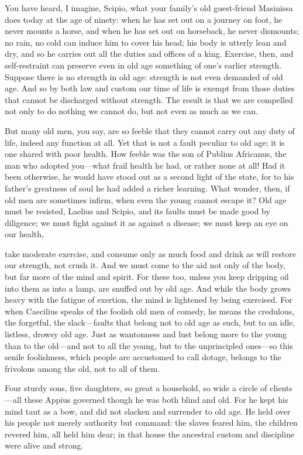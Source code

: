  You have heard, I imagine, Scipio, what your family's old guest-friend Masinissa does today at the age of ninety: when he has set out on a journey on foot, he never mounts a horse, and when he has set out on horseback, he never dismounts; no rain, no cold can induce him to cover his head; his body is utterly lean and dry, and so he carries out all the duties and offices of a king. Exercise, then, and self-restraint can preserve even in old age something of one's earlier strength. Suppose there is no strength in old age: strength is not even demanded of old age. And so by both law and custom our time of life is exempt from those duties that cannot be discharged without strength. The result is that we are compelled not only to do nothing we cannot do, but not even as much as we can.

 But many old men, you say, are so feeble that they cannot carry out any duty of life, indeed any function at all. Yet that is not a fault peculiar to old age; it is one shared with poor health. How feeble was the son of Publius Africanus, the man who adopted you—what frail health he had, or rather none at all! Had it been otherwise, he would have stood out as a second light of the state, for to his father's greatness of soul he had added a richer learning. What wonder, then, if old men are sometimes infirm, when even the young cannot escape it? Old age must be resisted, Laelius and Scipio, and its faults must be made good by diligence; we must fight against it as against a disease; we must keep an eye on our health,

 take moderate exercise, and consume only as much food and drink as will restore our strength, not crush it. And we must come to the aid not only of the body, but far more of the mind and spirit. For these too, unless you keep dripping oil into them as into a lamp, are snuffed out by old age. And while the body grows heavy with the fatigue of exertion, the mind is lightened by being exercised. For when Caecilius speaks of the foolish old men of comedy, he means the credulous, the forgetful, the slack—faults that belong not to old age as such, but to an idle, listless, drowsy old age. Just as wantonness and lust belong more to the young than to the old—and not to all the young, but to the unprincipled ones—so this senile foolishness, which people are accustomed to call dotage, belongs to the frivolous among the old, not to all of them.

 Four sturdy sons, five daughters, so great a household, so wide a circle of clients—all these Appius governed though he was both blind and old. For he kept his mind taut as a bow, and did not slacken and surrender to old age. He held over his people not merely authority but command: the slaves feared him, the children revered him, all held him dear; in that house the ancestral custom and discipline were alive and strong.

